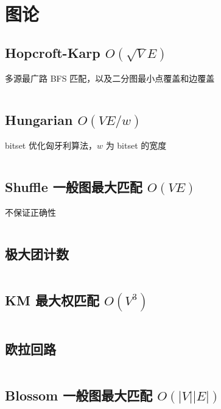 \section{图论}
				\subsection{Hopcroft-Karp \texorpdfstring{$O(\sqrt{V} E)$}{O(sqrt(V) E)}}
					多源最广路 BFS 匹配，以及二分图最小点覆盖和边覆盖
					\inputminted[highlightlines={5,9}]{cpp}{sections/GraphTheory/assets/graph/hk_skip2004.cpp}
				\subsection{Hungarian \texorpdfstring{$O(V E / w)$}{O(V E / w)}}
					bitset 优化匈牙利算法，$w$ 为 bitset 的宽度
					\inputminted{cpp}{sections/GraphTheory/assets/graph/Hungarian.cpp}
				\subsection{Shuffle 一般图最大匹配 \texorpdfstring{$O(V E)$}{O(V E)}}
					不保证正确性
					\inputminted{cpp}{sections/GraphTheory/assets/graph/一般图最大匹配-shuffle.cpp}
				\subsection{极大团计数}
					\inputminted{cpp}{sections/GraphTheory/assets/graph/CliqueCount.cpp}
				\subsection{KM 最大权匹配 \texorpdfstring{$O(V^3)$}{O(V³)}}
					\inputminted{cpp}{sections/GraphTheory/assets/graph/KM.cpp}
				\subsection{欧拉回路}
					\inputminted{cpp}{sections/GraphTheory/assets/graph/欧拉回路.cpp}
				\subsection{Blossom 一般图最大匹配 \texorpdfstring{$O(|V||E|)$}{O(|V||E|)}}
					\inputminted{cpp}{sections/GraphTheory/assets/graph/Blossom_Tree.cpp}

